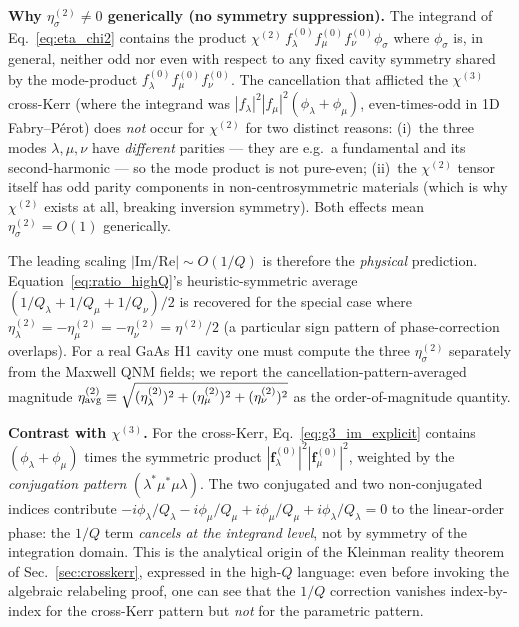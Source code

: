 \documentclass[12pt]{article}
\begin{document}
\textbf{Why $\eta^{(2)}_\sigma\neq 0$ generically (no symmetry suppression).}
The integrand of Eq.~\eqref{eq:eta_chi2} contains the product
$\chi^{(2)}\, f^{(0)}_\lambda f^{(0)}_\mu f^{(0)}_\nu \phi_\sigma$ where
$\phi_\sigma$ is, in general, neither odd nor even with respect to any
fixed cavity symmetry shared by the mode-product
$f^{(0)}_\lambda f^{(0)}_\mu f^{(0)}_\nu$.  The cancellation that
afflicted the $\chi^{(3)}$ cross-Kerr (where the integrand was
$|f_\lambda|^2|f_\mu|^2(\phi_\lambda+\phi_\mu)$, even-times-odd in 1D
Fabry--P\'erot) does \emph{not} occur for $\chi^{(2)}$ for two
distinct reasons: (i)~the three modes $\lambda,\mu,\nu$ have
\emph{different} parities --- they are e.g.\ a fundamental and its
second-harmonic --- so the mode product is not pure-even; (ii)~the
$\chi^{(2)}$ tensor itself has odd parity components in
non-centrosymmetric materials (which is why $\chi^{(2)}$ exists at all,
breaking inversion symmetry).  Both effects mean
$\eta^{(2)}_\sigma=O(1)$ generically.

The leading scaling $|\mathrm{Im}/\mathrm{Re}|\sim O(1/Q)$ is therefore
the \emph{physical} prediction.  Equation~\eqref{eq:ratio_highQ}'s
heuristic-symmetric average $(1/Q_\lambda+1/Q_\mu+1/Q_\nu)/2$ is
recovered for the special case where $\eta^{(2)}_\lambda=
-\eta^{(2)}_\mu=-\eta^{(2)}_\nu=\eta^{(2)}/2$ (a particular sign pattern
of phase-correction overlaps).  For a real GaAs H1 cavity one must
compute the three $\eta^{(2)}_\sigma$ separately from the Maxwell QNM
fields; we report the cancellation-pattern-averaged magnitude
$\eta^{(2)}_{\rm avg}\equiv\sqrt{(\eta^{(2)}_\lambda)^2+(\eta^{(2)}_\mu)^2
+(\eta^{(2)}_\nu)^2}$ as the order-of-magnitude quantity.

\textbf{Contrast with $\chi^{(3)}$.}  For the cross-Kerr,
Eq.~\eqref{eq:g3_im_explicit} contains $(\phi_\lambda+\phi_\mu)$
times the symmetric product $|\mathbf{f}^{(0)}_\lambda|^2
|\mathbf{f}^{(0)}_\mu|^2$, weighted by the \emph{conjugation pattern}
$(\lambda^*\mu^*\mu\lambda)$.  The two conjugated and two
non-conjugated indices contribute $-i\phi_\lambda/Q_\lambda
-i\phi_\mu/Q_\mu+i\phi_\mu/Q_\mu+i\phi_\lambda/Q_\lambda=0$ to the
linear-order phase: the $1/Q$ term \emph{cancels at the integrand level},
not by symmetry of the integration domain.  This is the analytical
origin of the Kleinman reality theorem of Sec.~\ref{sec:crosskerr},
expressed in the high-$Q$ language: even before invoking the
algebraic relabeling proof, one can see that the $1/Q$ correction
vanishes index-by-index for the cross-Kerr pattern but \emph{not} for
the parametric pattern.
\end{document}
